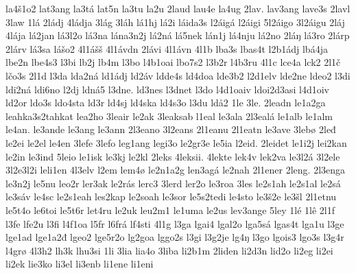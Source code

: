 {    la4š1o2
    lat3ang
    la3tá
    lat5n
    la3tu
    la2u
    2laud
    lau4e
    la4ug
    2lav.
    lav3ang
    lave3s
    2lavl
    3law
    1lá
    2ládj
    4ládja
    3lág
    3láh
    lá1hj
    lá2i
    láida3s
    l2áigá
    l2áigi
    5l2áigo
    3l2áigu
    2láj
    4lája
    lá2jan
    lá3l2o
    lá3na
    lána3n2j
    lá2ná
    lá5nek
    lán1j
    lá4nju
    lá2no
    2láŋ
    lá3ro
    2lárp
    2lárv
    lá3sa
    lášo2
    4l1ášš
    4l1ávdn
    2lávi
    4l1ávn
    4l1b
    lba3s
    lbas4t
    l2b1ádj
    lbá4ja
    lbe2n
    lbe4s3
    l3bi
    lb2j
    lb4m
    l3bo
    l4b1oai
    lbo7s2
    l3b2r
    l4b3ru
    4l1c
    lce4a
    lck2
    2l1č
    lčo3s
    2l1d
    l3da
    lda2ná
    ld1ádj
    ld2áv
    ldde4s
    ld4doa
    lde3b2
    l2d1elv
    lde2ne
    ldeo2
    l3di
    ldi2ná
    ldi6no
    l2dj
    ldná5
    l3dne.
    ld3nes
    l3dnet
    l3do
    l4d1oaiv
    ldoi2d3asi
    l4d1oiv
    ld2or
    ldo3s
    ldo4sta
    ld3r
    ld4sj
    ld4ska
    ld4s3o
    l3du
    ldå2
    1le
    3le.
    2leadn
    le1a2ga
    leahka3s2tahkat
    lea2ho
    3leair
    le2ak
    3leaksab
    l1eal
    le3ala
    2l3ealá
    le1alb
    le1alm
    le4an.
    le3ande
    le3ang
    le3ann
    2l3eano
    3l2eans
    2l1eanu
    2l1eatn
    le3ave
    3lebø
    2leđ
    le2ei
    le2el
    le4en
    3lefe
    3lefo
    leg1ang
    legi3o
    le2gr3e
    le5ia
    l2eid.
    2leidet
    le1i2j
    lei2kan
    le2in
    le3ind
    5leio
    le1isk
    le3kj
    le2kl
    2leks
    4leksii.
    4lekte
    lek4v
    lek2va
    le3l2á
    3l2ele
    3l2e3l2i
    leli1en
    4l3elv
    l2em
    lem4ø
    le2n1a2g
    len3agá
    le2nah
    2l1ener
    2leng.
    2l3enga
    le3n2j
    le5nu
    leo2r
    ler3ak
    le2rás
    lerc3
    3lerd
    ler2o
    le3roa
    3les
    le2s1ah
    le2s1al
    le2sá
    le3sáv
    le4sc
    le2s1eah
    les2kap
    le2soah
    le3sor
    le5s2tedi
    le4sto
    le3š2e
    le3šl
    2l1etnu
    le5t4o
    le6toi
    le5t6r
    let4ru
    le2uk
    leu2m1
    le1uma
    le2us
    lev3ange
    5ley
    1lé
    1lê
    2l1f
    l3fe
    lfe2u
    l3fi
    l4f1oa
    l5fr
    l6frá
    lf4sti
    4l1g
    l3ga
    lgai4
    lgal2o
    lga5sá
    lgas4t
    lga1u
    l3ge
    lge1ad
    lge1a2đ
    lgeo2
    lge5r2o
    lg2goa
    lggo2s
    l3gi
    l3g2je
    lg4ŋ
    l3go
    lgois3
    lgo3s
    l3g4r
    l4grø
    4l3h2
    lh3k
    lhu3si
    1li
    3lia
    lia4o
    3liba
    li2b1m
    2liden
    li2d3n
    lid2o
    li2eg
    li2ei
    li2ek
    lie3ko
    li3el
    li3enb
    li1ene
    li1eni
}
